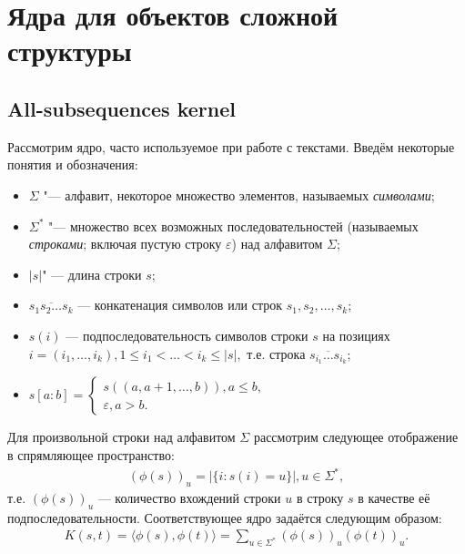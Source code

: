\documentclass[12pt,fleqn]{article}
\begin{document}
	\section{Ядра для объектов сложной структуры}
	\subsection{All-subsequences kernel}
	Рассмотрим ядро, часто используемое при работе с текстами. Введём некоторые понятия и обозначения:
	\begin{itemize}
		\item $\Sigma$ "--- алфавит, некоторое множество элементов, называемых \emph{символами};
		\item $\Sigma^*$ "--- множество всех возможных последовательностей (называемых \emph{строками}; включая пустую строку $\varepsilon$) над алфавитом $\Sigma$;
		\item $|s|$" --- длина строки $s$;
		\item $\overline{s_1 s_2 \dots s_k}$ — конкатенация символов или строк $s_1, s_2, \dots, s_k$;
		\item $s(i)$ — подпоследовательность символов строки $s$ на позициях $i = (i_1, \dots, i_k), 1 \le i_1 < \dots < i_k \le |s|,$ т.е. строка $\overline{s_{i_1} \dots s_{i_k}};$
		\item $s[a:b] = \begin{cases}
								s((a, a+1, \dots, b)), a \le b,\\
								\varepsilon, a > b.
							\end{cases}$
	\end{itemize}
	\par Для произвольной строки над алфавитом $\Sigma$ рассмотрим следующее отображение в спрямляющее пространство:
	\begin{align*}
		(\phi(s))_u = |\{i: s(i) = u\}|, u \in \Sigma^*,
	\end{align*}
	т.е. $(\phi(s))_u$ — количество вхождений строки $u$ в строку $s$ в качестве её подпоследовательности. Соответствующее ядро задаётся следующим образом:
	\begin{align*}
		K(s, t) = \langle \phi(s), \phi(t) \rangle = \sum_{u \in \Sigma^*} (\phi(s))_u (\phi(t))_u.
	\end{align*}
	
\end{document}
